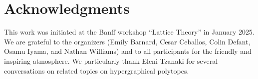 \documentclass{amsart}
\theoremstyle{definition}
\begin{document}

\section*{Acknowledgments}

This work was initiated at the Banff workshop ``Lattice Theory'' in January 2025.
We are grateful to the organizers (Emily Barnard, Cesar Ceballos, Colin Defant, Osamu Iyama, and Nathan Williams) and to all participants for the friendly and inspiring atmosphere.
We particularly thank Eleni Tzanaki for several conversations on related topics on hypergraphical polytopes.




\label{sec:biblio}

\end{document}
